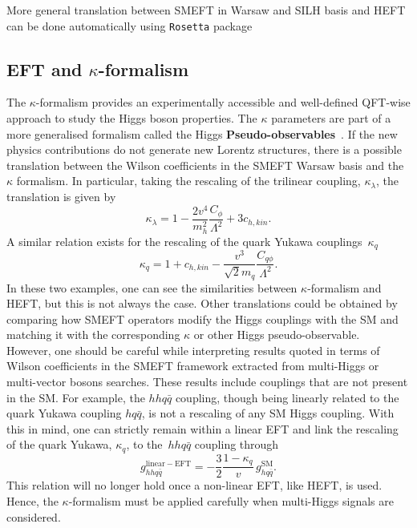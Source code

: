 More general translation between SMEFT in Warsaw and SILH basis and HEFT can be done automatically using \texttt{Rosetta} package~\cite{Falkowski:2015wza}
\subsection{EFT and $\kappa$-formalism \label{eftkappa}}
The $\kappa$-formalism provides an experimentally accessible and well-defined QFT-wise approach to study the Higgs boson properties. The $\kappa$ parameters are part of a more generalised formalism called the Higgs \textbf{Pseudo-observables}~\cite{Gonzalez-Alonso:2014eva}. 
If the new physics contributions do not generate new Lorentz structures, there is a possible translation between the Wilson coefficients in the SMEFT Warsaw basis and the $\kappa$ formalism. In particular, taking the rescaling of the trilinear coupling, $\kappa_\lambda$, the translation is given by
\begin{equation}
	\kappa_\lambda = 1-\frac{2v^4}{m_h^2} \frac{C_\phi}{\Lambda^2}+3 c_{h,kin}.
\end{equation}
A similar relation exists for the rescaling of the quark Yukawa couplings~$\kappa_q$
\begin{equation}
	\kappa_q = 1+c_{h,kin}- \frac{v^3}{\sqrt{2}m_q}\frac{C_{q\phi}}{\Lambda^2}.
\end{equation}
In these two examples, one can see the similarities between $\kappa$-formalism and HEFT, but this is not always the case.  Other translations could be obtained by comparing how SMEFT operators modify the Higgs couplings with the SM and matching it with the corresponding $\kappa$ or other Higgs pseudo-observable.\\ 
However, one should be careful while interpreting results quoted in terms of Wilson coefficients in the SMEFT framework extracted from multi-Higgs or multi-vector bosons searches. These results include couplings that are not present in the SM. For example, the $hh q\bar{q}$ coupling, though being linearly related to the quark Yukawa coupling $h q\bar{q}$, is not a rescaling of any SM Higgs coupling. With this in mind, one can strictly remain within a linear EFT and link the rescaling of the quark Yukawa, $\kappa_q$, to the~$hh q\bar{q}$ coupling through
\begin{equation}
	g_{hhq\bar{q}}^{\mathrm{linear-EFT}} = -\frac{3}{2}\frac{1-\kappa_q}{v} \, g_{h q\bar{q}}^{\mathrm{SM}}.
\end{equation}
This relation will no longer hold once a non-linear EFT, like HEFT, is used. Hence, the $\kappa$-formalism must be applied carefully when multi-Higgs signals are considered.
